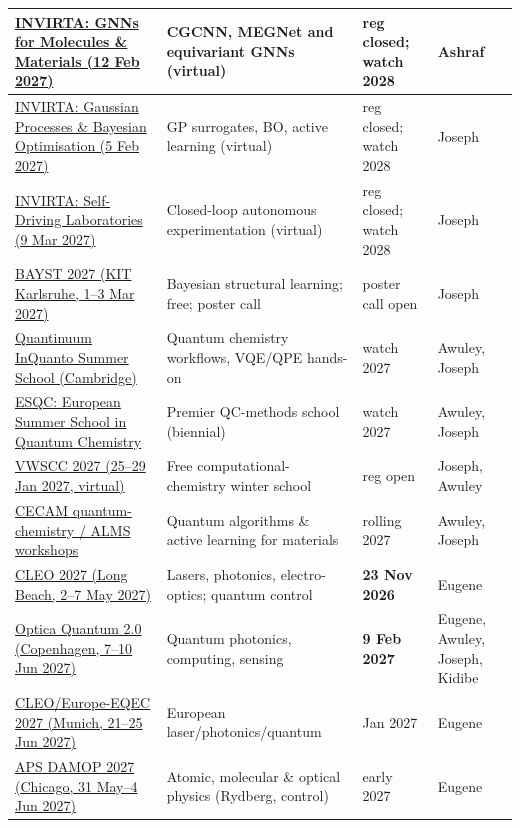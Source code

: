 \documentclass[11pt,a4paper]{article}
\begin{document}
\begin{longtable}{@{}p{3.4cm}p{5.6cm}p{2.2cm}p{2.7cm}@{}}
\midrule
\href{https://www.invirta.com/workshops/am/workshop-5-5}{INVIRTA: GNNs for Molecules \& Materials (12 Feb 2027)} & CGCNN, MEGNet and equivariant GNNs (virtual) & reg closed; watch 2028 & Ashraf \\
\midrule
\href{https://www.invirta.com/workshops/am/workshop-5-4}{INVIRTA: Gaussian Processes \& Bayesian Optimisation (5 Feb 2027)} & GP surrogates, BO, active learning (virtual) & reg closed; watch 2028 & Joseph \\
\midrule
\href{https://www.invirta.com/workshops/am/workshop-5-13}{INVIRTA: Self-Driving Laboratories (9 Mar 2027)} & Closed-loop autonomous experimentation (virtual) & reg closed; watch 2028 & Joseph \\
\midrule
\href{https://www.linkedin.com/posts/kleinlab-mbd_bayst-2027-activity-7474814477058891778-7WfC}{BAYST 2027 (KIT Karlsruhe, 1--3 Mar 2027)} & Bayesian structural learning; free; poster call & poster call open & Joseph \\
\midrule
\href{https://www.quantinuum.com/inquanto-summer-school}{Quantinuum InQuanto Summer School (Cambridge)} & Quantum chemistry workflows, VQE/QPE hands-on & watch 2027 & Awuley, Joseph \\
\midrule
\href{https://www.esqc.org/}{ESQC: European Summer School in Quantum Chemistry} & Premier QC-methods school (biennial) & watch 2027 & Awuley, Joseph \\
\midrule
\href{https://winterschool.cc/}{VWSCC 2027 (25--29 Jan 2027, virtual)} & Free computational-chemistry winter school & reg open & Joseph, Awuley \\
\midrule
\href{https://www.cecam.org/program}{CECAM quantum-chemistry / ALMS workshops} & Quantum algorithms \& active learning for materials & rolling 2027 & Awuley, Joseph \\
\midrule
\href{https://cleoconference.org/}{CLEO 2027 (Long Beach, 2--7 May 2027)} & Lasers, photonics, electro-optics; quantum control & \textbf{23 Nov 2026} & Eugene \\
\midrule
\href{https://www.optica.org/events/topical_meetings/quantum/submit_a_paper/}{Optica Quantum 2.0 (Copenhagen, 7--10 Jun 2027)} & Quantum photonics, computing, sensing & \textbf{9 Feb 2027} & Eugene, Awuley, Joseph, Kidibe \\
\midrule
\href{https://cleoeurope.org/deadlines/}{CLEO/Europe-EQEC 2027 (Munich, 21--25 Jun 2027)} & European laser/photonics/quantum & Jan 2027 & Eugene \\
\midrule
\href{https://ucan.physics.utoronto.ca/conferences/damop2027/}{APS DAMOP 2027 (Chicago, 31 May--4 Jun 2027)} & Atomic, molecular \& optical physics (Rydberg, control) & early 2027 & Eugene \\
\midrule


\end{longtable}
\end{document}
